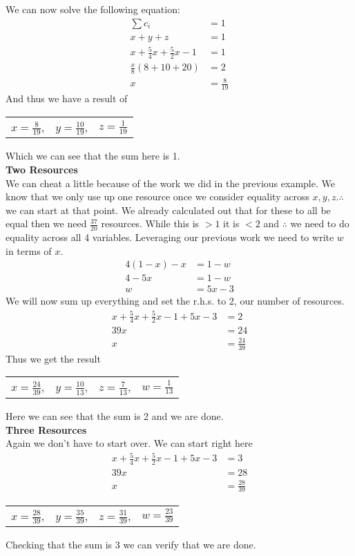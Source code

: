 \documentclass[12pt,letter]{article}
\begin{document}
We can now solve the following equation:
\begin{align*}
    \sum c_i &= 1\\
    x + y + z &= 1\\
    x + \frac54x + \frac52x - 1 &= 1\\
    \frac{x}{8}(8 + 10 + 20) &= 2 \\
    x &= \frac{8}{19}
\end{align*}
And thus we have a result of 
\\
\begin{figure*}[h!]
\centering
\begin{tabular}{c c c}
    $x=\frac{8}{19}$, & $y=\frac{10}{19}$, & $z=\frac{1}{19}$
\end{tabular}
\end{figure*}
Which we can see that the sum here is 1.
\\
\large\textbf{Two Resources}\normalsize
\\
We can cheat a little because of the work we did in the previous example. We know
that we only use up one resource once we consider equality across $x,y,z. 
\therefore$ we can start at that point. We already calculated out that for these
to all be equal then we need $\frac{37}{20}$ resources. While this is $> 1$ it
is $<2$ and $\therefore$ we need to do equality across all 4 variables. Leveraging
our previous work we need to write $w$ in terms of $x$.
\begin{align*}
    4(1-x) - x &= 1-w\\
    4 - 5x &= 1 - w\\
    w &= 5x - 3
\end{align*}
We will now sum up everything and set the r.h.s. to 2, our number of resources.
\begin{align*}
    x + \frac54x + \frac52x - 1 + 5x - 3 &= 2\\
    39x &= 24\\
    x &= \frac{24}{39}
\end{align*}
Thus we get the result
\begin{figure*}[h!]
\centering
\begin{tabular}{c c c c}
    $x=\frac{24}{39}$, & $y=\frac{10}{13}$, & $z=\frac{7}{13}$, & $w=\frac{1}{13}$
\end{tabular}
\end{figure*}
Here we can see that the sum is 2 and we are done. 
\\
\large\textbf{Three Resources}\normalsize
\\
Again we don't have to start over. We can start right here
\begin{align*}
    x + \frac54x + \frac52x - 1 + 5x - 3 &= 3\\
    39x &= 28\\
    x &= \frac{28}{39}
\end{align*}
\begin{figure*}[h!]
\centering
\begin{tabular}{c c c c}
    $x=\frac{28}{39}$, & $y=\frac{35}{39}$, & $z=\frac{31}{39}$, & $w=\frac{23}{39}$
\end{tabular}
\end{figure*}
Checking that the sum is 3 we can verify that we are done.
\end{document}
